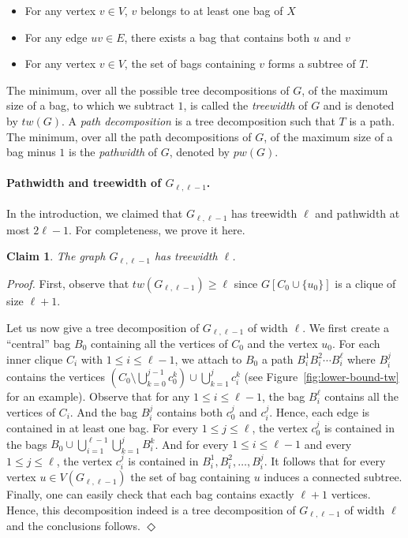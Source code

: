 \documentclass[10pt]{article}
\newtheorem{claim}{Claim}
\newenvironment{proofclaim}[1][]%
    {\noindent \emph{Proof.} {}{#1}{}}{\hfill
    $\Diamond$\vspace{1em}}
\begin{document}
\begin{itemize}
    \item For any vertex $v\in V$, $v$ belongs to at least one bag of $X$
    \item For any edge $uv\in E$, there exists a bag that contains both $u$ and $v$
    \item For any vertex $v\in V$, the set of bags containing $v$ forms a subtree of $T$.
\end{itemize}

The minimum, over all the possible tree decompositions of $G$, of the maximum size of a bag, to which we subtract $1$, is called the \emph{treewidth} of $G$ and is denoted by $tw(G)$.  A \emph{path decomposition} is a tree decomposition such that $T$ is a path. The minimum, over all the path decompositions of $G$, of the maximum size of a bag minus $1$ is the \emph{pathwidth} of $G$, denoted by $pw(G)$.

\paragraph{Pathwidth and treewidth of $G_{\ell,\ell-1}$.}
In the introduction, we claimed that $G_{\ell,\ell-1}$ has treewidth $\ell$ and pathwidth at most $2\ell-1$. For completeness, we prove it here.

\begin{claim} \label{claim:tw-lower-bound}
The graph $G_{\ell,\ell-1}$ has treewidth $\ell$.
\end{claim}

\begin{proofclaim}
First, observe that $tw(G_{\ell,\ell-1}) \ge \ell$ since $G[C_0 \cup \{u_0\}]$ is a clique of size $\ell+1$. 

Let us now give a tree decomposition of $G_{\ell,\ell-1}$ of width $\ell$. We first create a ``central'' bag $B_0$ containing all the vertices of $C_0$ and the vertex $u_0$. For each inner clique $C_i$ with $1 \le i \le \ell-1$, we attach to $B_0$ a path $B_i^1B_i^2 \cdots B_i^{\ell}$ where $B_i^j$ contains the vertices $(C_0 \setminus \bigcup_{k=0}^{j-1} c_0^k) \cup \bigcup_{k=1}^j c_i^k$ (see Figure~\ref{fig:lower-bound-tw} for an example). Observe that for any $1 \le i \le \ell-1$, the bag $B_i^\ell$ contains all the vertices of $C_i$. And the bag $B_i^j$ contains both $c_0^j$ and $c_i^j$. Hence, each edge is contained in at least one bag. For every $1 \le j \le \ell$, the vertex $c_0^j$ is contained in the bags $B_0 \cup \bigcup_{i=1}^{\ell-1} \bigcup_{k=1}^j B_i^k$. And for every $1 \le i \le \ell-1$ and every $1 \le j \le \ell$, the vertex $c_i^j$ is contained in $B_i^1, B_i^2, \ldots, B_i^j$. It follows that for every vertex $u \in V(G_{\ell,\ell-1})$ the set of bag containing $u$ induces a connected subtree. Finally, one can easily check that each bag contains exactly $\ell+1$ vertices. Hence, this decomposition indeed is a tree decomposition of $G_{\ell,\ell-1}$ of width $\ell$ and the conclusions follows.
\end{proofclaim}
\end{document}
